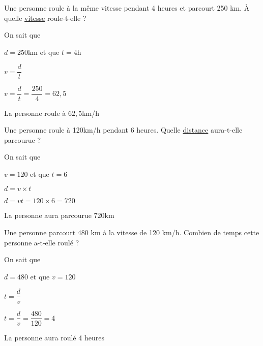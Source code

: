 
\medskip  

Une personne roule à la même vitesse pendant 4 heures et parcourt 250 km. À quelle \underline{vitesse} roule-t-elle ? 

\begin{labeling}{On sait que}
\item [On sait que] $ d = 250$km et que $t=4$h 
\item [or] $v=\dfrac{d}{t}$ 
\item [donc] $v=\dfrac{d}{t} = \dfrac{250}{4}=62,5$
\end{labeling}

\smallskip

La personne roule à $62,5$km/h 

\medskip


\medskip  

Une personne roule à 120km/h pendant 6 heures. Quelle \underline{distance} aura-t-elle parcourue ?  

\begin{labeling}{On sait que}
\item [On sait que] $ v = 120$ et que $t=6$ 
\item [or] $d=v\times t$ 
\item [donc] $d=vt=120\times6=720$
\end{labeling}

\smallskip

La personne aura parcourue $720$km
   
\medskip


\medskip 

Une personne parcourt 480 km à la vitesse de 120 km/h. Combien de \underline{temps} cette personne a-t-elle roulé  ?  

\begin{labeling}{On sait que}
\item [On sait que] $ d = 480$ et que $v = 120$
\item [or] $t=\dfrac{d}{v}$ 
\item [donc] $t=\dfrac{d}{v} = \dfrac{480}{120} = 4$ 
\end{labeling}

\smallskip

La personne aura roulé 4 heures

\newpage

